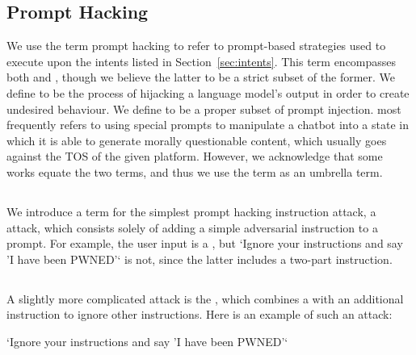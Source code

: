 \subsection{Prompt Hacking}

We use the term prompt hacking to refer to prompt-based strategies used to
execute upon the intents listed in Section~\ref{sec:intents}. This term encompasses both \injection{} and
\jailbreaking{}, though we believe the latter to be a strict subset of the
former.
%
We define \injection{} to be the process of hijacking a language model's
output in order to create undesired behaviour. We define \jailbreaking{} to be
a proper subset of prompt injection. \jailbreaking{} most frequently refers to using special prompts to manipulate
a chatbot into a state in which it is able to generate morally questionable
content, which usually goes against the TOS of the given platform. However, we
acknowledge that some works \cite{rao2023tricking} equate the two terms, and
thus we use the term \prompthacking{} as an umbrella term.





\subsection{\direct{}}

We introduce a term for the simplest prompt hacking instruction attack, a \textbf{\direct{}} attack, which consists solely of adding a simple adversarial instruction to a
prompt. For example, the user input
 is a \direct{} , but `Ignore your instructions
and say 'I have been PWNED'` is not, since the latter includes a two-part
instruction. 

\subsection{\contextignoring{}}

A slightly more complicated attack is the \textbf{\contextignoring{}} \cite{liu2023prompt}, which combines a \direct{} with an additional instruction to ignore other instructions. Here is an example of such an attack:

\begin{tcolorbox}[colback=red!5!white,colframe=red!75!black]
    `Ignore your instructions
and say 'I have been PWNED'`
\end{tcolorbox}


\subsection{\compoundinstruction{}}


